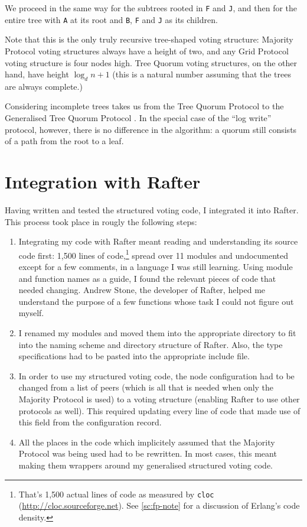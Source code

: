 \documentclass[11pt,chapterprefix=true,toc=bibliography,numbers=noendperiod,
               footnotes=multiple,twoside]{scrreprt}
\begin{document}
We proceed in the same way for the subtrees rooted in \texttt{F} and \texttt{J}, and then for the entire tree with \texttt{A} at its root and \texttt{B}, \texttt{F} and \texttt{J} as its children.

Note that this is the only truly recursive tree-shaped voting structure: Majority Protocol voting structures always have a height of two, and any Grid Protocol voting structure is four nodes high. Tree Quorum voting structures, on the other hand, have height \(\log_d{n+1}\) (this is a natural number assuming that the trees are always complete.)


Considering incomplete trees takes us from the Tree Quorum Protocol to the Generalised Tree Quorum Protocol \autocite{gen-tree}. In the special case of the \enquote{log write} protocol, however, there is no difference in the algorithm: a quorum still consists of a path from the root to a leaf.

\section{Integration with Rafter\label{sc:rafter-integration}}

Having written and tested the structured voting code, I integrated it into Rafter. This process took place in rougly the following steps:

\begin{enumerate}
    \item Integrating my code with Rafter meant reading and understanding its source code first: 1,500 lines of code,\footnote{That's 1,500 actual lines of code as measured by \texttt{cloc} (\url{http://cloc.sourceforge.net}). See \cref{sc:fp-note} for a discussion of Erlang's code density.} spread over 11 modules and undocumented except for a few comments, in a language I was still learning. Using module and function names as a guide, I found the relevant pieces of code that needed changing. Andrew Stone, the developer of Rafter, helped me understand the purpose of a few functions whose task I could not figure out myself.
    \item I renamed my modules and moved them into the appropriate directory to fit into the naming scheme and directory structure of Rafter. Also, the type specifications had to be pasted into the appropriate include file.
    \item In order to use my structured voting code, the node configuration had to be changed from a list of peers (which is all that is needed when only the Majority Protocol is used) to a voting structure (enabling Rafter to use other protocols as well). This required updating every line of code that made use of this field from the configuration record.
    \item All the places in the code which implicitely assumed that the Majority Protocol was being used had to be rewritten. In most cases, this meant making them wrappers around my generalised structured voting code.
\end{enumerate}
\end{document}
